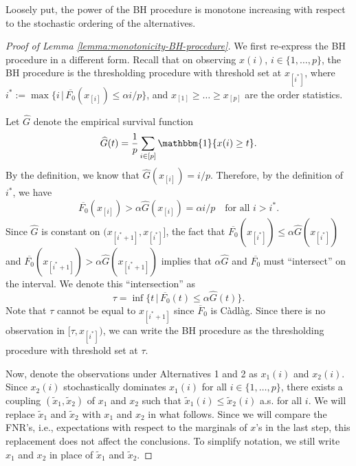Loosely put, the power of the BH procedure is monotone increasing with respect to the stochastic ordering of the alternatives.

\begin{proof}[Proof of Lemma \ref{lemma:monotonicity-BH-procedure}]
We first re-express the BH procedure in a different form.
Recall that on observing $x(i)$, $i\in\{1,\ldots,p\}$, the BH procedure is the thresholding procedure with threshold set at $x_{[i^*]}$, where $i^* := \max\{i\,|\,\overline{F_0}(x_{[i]})\le \alpha i/p\}$, and $x_{[1]}\ge\ldots\ge x_{[p]}$ are the order statistics.

Let $\widehat{G}$ denote the empirical survival function
\begin{equation} \label{eq:empirical-tail-distribution}
    \widehat{G}(t) = \frac{1}{p}\sum_{i\in[p]}\mathbbm{1}\{x(i) \ge t\}.
\end{equation}
By the definition, we know that $\widehat{G}(x_{[i]}) = i/p$.
Therefore, by the definition of $i^*$, we have
\begin{equation*} 
    \overline{F_0}(x_{[i]}) > \alpha\widehat{G}(x_{[i]}) = \alpha i/p \quad \text{for all }i>i^*.
\end{equation*}
Since $\widehat{G}$ is constant on $(x_{[i^*+1]}, x_{[i^*]}]$, the fact that 
$\overline{F_0}(x_{[i^*]}) \le \alpha\widehat{G}(x_{[i^*]})$ and $\overline{F_0}(x_{[i^*+1]}) > \alpha\widehat{G}(x_{[i^*+1]})$ implies that $\alpha\widehat{G}$ and $\overline{F_0}$ must ``intersect'' on the interval.
We denote this ``intersection'' as
\begin{equation} \label{eq:approx-boundary-proof-tau}
    \tau = \inf\{t\,|\,\overline{F_0}(t)\le\alpha\widehat{G}(t)\}. 
\end{equation}
Note that $\tau$ cannot be equal to $x_{[i^*+1]}$ since $\overline{F}_0$ is C\`adl\`ag.
Since there is no observation in $[\tau, x_{[i^*]})$, we can write the BH procedure as the thresholding procedure with threshold set at $\tau$.

Now, denote the observations under Alternatives 1 and 2 as $x_1(i)$ and $x_2(i)$.
Since $x_2(i)$ stochastically dominates $x_1(i)$ for all $i\in\{1,\ldots,p\}$, there exists a coupling $(\widetilde{x}_1, \widetilde{x}_2)$ of $x_1$ and $x_2$ such that 
$\widetilde{x}_1(i) \le \widetilde{x}_2(i)$ a.s. for all $i$.
We will replace $\widetilde{x}_1$ and $\widetilde{x}_2$ with $x_1$ and $x_2$ in what follows.
Since we will compare the FNR's, i.e., expectations with respect to the marginals of ${x}$'s in the last step, this replacement does not affect the conclusions.
To simplify notation, we still write $x_1$ and $x_2$ in place of $\widetilde{x}_1$ and $\widetilde{x}_2$.


\end{proof}
